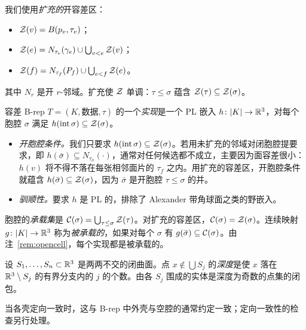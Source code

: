 \begin{definition}[容差区]\label{def:zones}
我们使用\emph{扩充的}开容差区：
\begin{itemize}
\item $\mathcal{Z}(v)=B(p_v,\tau_v)$；
\item $\mathcal{Z}(e)=N_{\tau_e}(\gamma_e)\cup\bigcup_{v<e}\mathcal{Z}(v)$；
\item $\mathcal{Z}(f)=N_{\tau_f}(P_f)\cup\bigcup_{e<f}\mathcal{Z}(e)$。
\end{itemize}
其中 $N_r$ 是开 $r$-邻域。扩充使 $\mathcal{Z}$ 单调：$\tau\le\sigma$ 蕴含 $\mathcal{Z}(\tau)\subseteq\mathcal{Z}(\sigma)$。
\end{definition}

\begin{definition}[实现]\label{def:realization}
容差 B-rep $T=(K,\text{数据},\tau)$ 的一个\emph{实现}是一个 PL 嵌入 $h\colon|K|\to\mathbb{R}^3$，对每个胞腔 $\sigma$ 满足 $h(\operatorname{int}\sigma)\subseteq\mathcal{Z}(\sigma)$。
\end{definition}

\begin{remark}\label{rem:opencell}
\begin{itemize}
\item \emph{开胞腔条件。}我们只要求 $h(\operatorname{int}\sigma)\subseteq\mathcal{Z}(\sigma)$。若用未扩充的邻域对闭胞腔提要求，即 $h(\bar\sigma)\subseteq N_{\tau_\sigma}(\cdot)$，通常对任何候选都不成立，主要因为面容差很小：$h(v)$ 将不得不落在每张相邻面片的 $\tau_f$ 之内。用扩充的容差区，开胞腔条件就蕴含 $h(\bar\sigma)\subseteq\mathcal{Z}(\sigma)$，因为 $\bar\sigma$ 是开胞腔 $\tau\le\sigma$ 的并。
\item \emph{驯顺性。}要求 $h$ 是 PL 的，排除了 Alexander 带角球面之类的野嵌入。
\end{itemize}
\end{remark}

\begin{definition}[承载集]
胞腔的\emph{承载集}是 $\mathcal{C}(\sigma)=\bigcup_{\tau\le\sigma}\mathcal{Z}(\tau)$。对扩充的容差区，$\mathcal{C}(\sigma)=\mathcal{Z}(\sigma)$。连续映射 $g\colon|K|\to\mathbb{R}^3$ 称为\emph{被承载的}，如果对每个 $\sigma$ 有 $g(\bar\sigma)\subseteq\mathcal{C}(\sigma)$。由注~\ref{rem:opencell}，每个实现都是被承载的。
\end{definition}

\begin{definition}[实体]\label{def:solid}
设 $S_1,\dots,S_n\subset\mathbb{R}^3$ 是两两不交的闭曲面。点 $x\notin\bigcup S_j$ 的\emph{深度}是使 $x$ 落在 $\mathbb{R}^3\setminus S_j$ 的有界分支内的 $j$ 的个数。由各 $S_j$ 围成的实体是深度为奇数的点集的闭包。
\end{definition}
当各壳定向一致时，这与 B-rep 中外壳与空腔的通常约定一致；定向一致性的检查另行处理。
